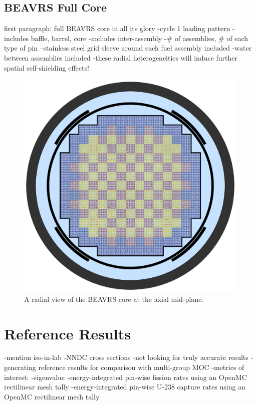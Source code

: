 \subsection{BEAVRS Full Core}
\label{subsec:chap7-full-core}

first paragraph: full \ac{BEAVRS} core in all its glory
-cycle 1 loading pattern
-includes baffle, barrel, core
-includes inter-assembly 
-\# of assemblies, \# of each type of pin
--stainless steel grid sleeve around each fuel assembly included
-water between assemblies included
  -these radial heterogeneities will induce further spatial self-shielding effects!

\begin{figure}[h!]
  \centering
  \includegraphics[width=0.9\linewidth]{figures/benchmarks/full-core}
\caption[The \ac{BEAVRS} core at the axial mid-plane.]{A radial view of the \ac{BEAVRS} core at the axial mid-plane.}
\label{fig:chap7-full-core}
\end{figure}


\section{Reference Results}
\label{sec:chap7-ref-results}

-mention iso-in-lab
-NNDC cross sections
  -not looking for truly accurate results
  -generating reference results for comparison with multi-group \ac{MOC}
-metrics of interest:
  -eigenvalue
  -energy-integrated pin-wise fission rates using an OpenMC rectilinear mesh tally
  -energy-integrated pin-wise U-238 capture rates using an OpenMC rectilinear mesh tally
 
